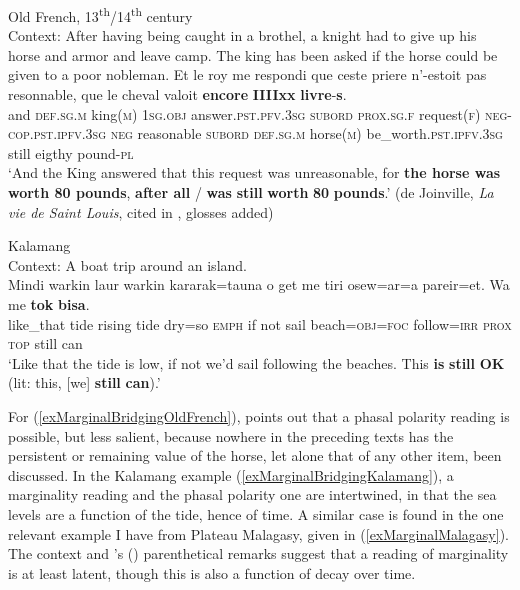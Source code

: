\begin{exe}
	\ex Old French, 13\textsuperscript{th}/14\textsuperscript{th} century\label{exMarginalBridgingOldFrench}\\
	Context: After having being caught in a brothel, a knight had to give up his horse and armor and leave camp. The king has been asked if the horse could be given to a poor nobleman.
	\exi{}\gll Et le roy me respondi que ceste priere n’-estoit pas resonnable, que le cheval valoit \textbf{encore} \textbf{IIIIxx} \textbf{livre}-\textbf{s}.\\
and \textsc{def}.\textsc{sg}.\textsc{m} king(\textsc{m}) 1\textsc{sg}.\textsc{obj} answer.\textsc{pst}.\textsc{pfv}.3\textsc{sg} \textsc{subord} \textsc{prox}.\textsc{sg}.\textsc{f} request(\textsc{f}) \textsc{neg}-\textsc{cop}.\textsc{pst}.\textsc{ipfv}.3\textsc{sg} \textsc{neg} reasonable \textsc{subord} \textsc{def}.\textsc{sg}.\textsc{m} horse(\textsc{m}) be\_worth.\textsc{pst}.\textsc{ipfv}.3\textsc{sg} still eigthy pound-\textsc{pl}\\
\glt \lq And the King answered that this request was unreasonable, for \textbf{the horse was worth 80 pounds}, \textbf{after all} / \textbf{was} \textbf{still} \textbf{worth} \textbf{80} \textbf{pounds}.' (de Joinville, \textit{La vie de Saint Louis}, cited in \cite[177–178]{MosegaardHansen2008}, glosses added)

	\ex Kalamang\label{exMarginalBridgingKalamang}\\
	Context: A boat trip around an island.\\
	\gll Mindi warkin laur warkin kararak=tauna o {get me} tiri osew=ar=a pareir=et. Wa me  \textbf{tok} \textbf{bisa}.\\
	like\_that tide rising tide dry=so \textsc{emph} {if not} sail beach=\textsc{obj}=\textsc{foc} follow=\textsc{irr} \textsc{prox} \textsc{top} still can\\
	\glt \lq Like that the tide is low, if not we’d sail following the beaches.  This \textbf{is} \textbf{still} \textbf{OK} (lit: this, [we] \textbf{still} \textbf{can}).' \parencite{Visser2021b}
\end{exe}

For (\ref{exMarginalBridgingOldFrench}), \textcite[177]{MosegaardHansen2008} points out that a phasal polarity reading is possible, but less salient, because nowhere in the preceding texts has the persistent or remaining value of the horse, let alone that of any other item, been discussed. In the Kalamang example (\ref{exMarginalBridgingKalamang}), a marginality reading and the phasal polarity one are intertwined, in that the sea levels are a function of the tide, hence of time. A similar case is found in the one relevant example I have from Plateau Malagasy, given in (\ref{exMarginalMalagasy}). The context and \citeauthor{Dez1980}'s (\citeyear{Dez1980}) parenthetical remarks suggest that a reading of marginality is at least latent, though this is also a function of decay over time.

